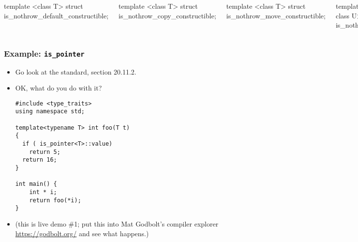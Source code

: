 \begin{frame}[fragile,t]
\begin{columns}[t]
{template <class T> struct is\_nothrow\_default\_constructible;

template <class T> struct is\_nothrow\_copy\_constructible;

template <class T> struct is\_nothrow\_move\_constructible;

template <class T, class U> struct is\_nothrow\_assignable;

template <class T> struct is\_nothrow\_copy\_assignable;

template <class T> struct is\_nothrow\_move\_assignable;

template <class T> struct is\_nothrow\_destructible;

template <class T> struct has\_virtual\_destructor;



}

\end{columns}


\end{frame}


\begin{frame}[fragile,t]
\frametitle{Example: \texttt{is\_pointer}}
\begin{itemize}[<+->]
\item Go look at the  standard, section 20.11.2.
\item OK, what do you do with it?
{\scriptsize\begin{verbatim}
#include <type_traits>
using namespace std;

template<typename T> int foo(T t)
{
  if ( is_pointer<T>::value) 
    return 5;
  return 16;
}

int main() {
  	int * i;
  	return foo(*i);
}
\end{verbatim}
}


\item (this is live demo \#1; put this into Mat Godbolt's compiler
  explorer \url{https://godbolt.org/} and see what happens.)

\end{itemize}
\end{frame}

